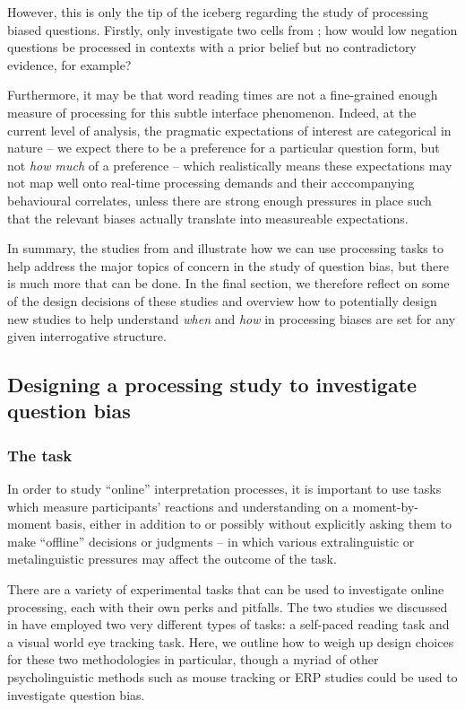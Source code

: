 \documentclass[output=paper,colorlinks,citecolor=brown]{langscibook}
\begin{document}
However, this is only the tip of the iceberg regarding the study of processing biased questions. Firstly, \citet{macuch_processing_inprep} only investigate two cells from ; how would low negation questions be processed in contexts with a prior belief but no contradictory evidence, for example? 

Furthermore, it may be that word reading times are not a fine-grained enough measure of processing for this subtle interface phenomenon. Indeed, at the current level of analysis, the pragmatic expectations of interest are categorical in nature -- we expect there to be a preference for a particular question form, but not \textit{how much} of a preference -- which realistically means these expectations may not map well onto real-time processing demands and their acccompanying behavioural correlates, unless there are strong enough pressures in place such that the relevant biases actually translate into measureable expectations.

In summary, the studies from \citet{tian_representing_2021} and \citet{macuch_processing_inprep} illustrate how we can use processing tasks to help address the major topics of concern in the study of question bias, but there is much more that can be done. In the final section, we therefore reflect on some of the design decisions of these studies and overview how to potentially design new studies to help understand \textit{when} and \textit{how} in processing biases are set for any given interrogative structure.

\subsection{Designing a processing study to investigate question bias}\label{3.3}


\subsubsection{The task}

In order to study ``online'' interpretation processes, it is important to use tasks which measure participants' reactions and understanding on a moment-by-moment basis, either in addition to or possibly without explicitly asking them to make ``offline'' decisions or judgments --  in which various extralinguistic or metalinguistic pressures may affect the outcome of the task.

There are a variety of experimental tasks that can be used to investigate online processing, each with their own perks and pitfalls. The two studies we discussed in  have employed two very different types of tasks: a self-paced reading task and a visual world eye tracking task. Here, we outline how to weigh up design choices for these two methodologies in particular, though a myriad of other psycholinguistic methods such as mouse tracking or ERP studies could be used to investigate question bias.
\end{document}
